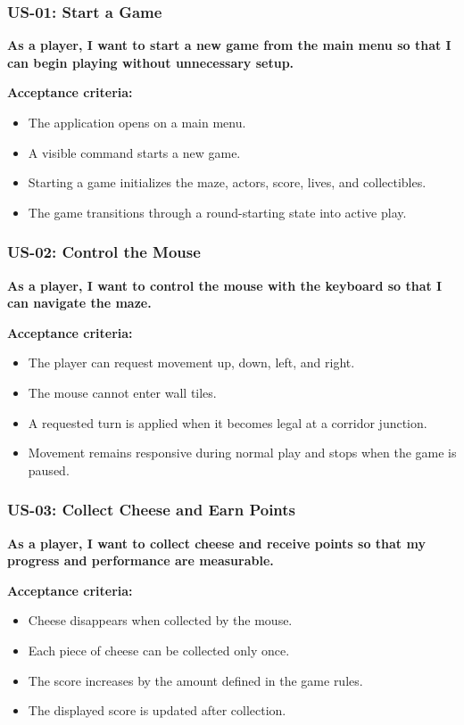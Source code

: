 \subsubsection{US-01: Start a Game}

\textbf{As a player, I want to start a new game from the main menu so that I can begin playing without unnecessary setup.}

\textbf{Acceptance criteria:}
\begin{itemize}
	\item The application opens on a main menu.
	\item A visible command starts a new game.
	\item Starting a game initializes the maze, actors, score, lives, and collectibles.
	\item The game transitions through a round-starting state into active play.
\end{itemize}

\subsubsection{US-02: Control the Mouse}

\textbf{As a player, I want to control the mouse with the keyboard so that I can navigate the maze.}

\textbf{Acceptance criteria:}
\begin{itemize}
	\item The player can request movement up, down, left, and right.
	\item The mouse cannot enter wall tiles.
	\item A requested turn is applied when it becomes legal at a corridor junction.
	\item Movement remains responsive during normal play and stops when the game is paused.
\end{itemize}

\subsubsection{US-03: Collect Cheese and Earn Points}

\textbf{As a player, I want to collect cheese and receive points so that my progress and performance are measurable.}

\textbf{Acceptance criteria:}
\begin{itemize}
	\item Cheese disappears when collected by the mouse.
	\item Each piece of cheese can be collected only once.
	\item The score increases by the amount defined in the game rules.
	\item The displayed score is updated after collection.
\end{itemize}

